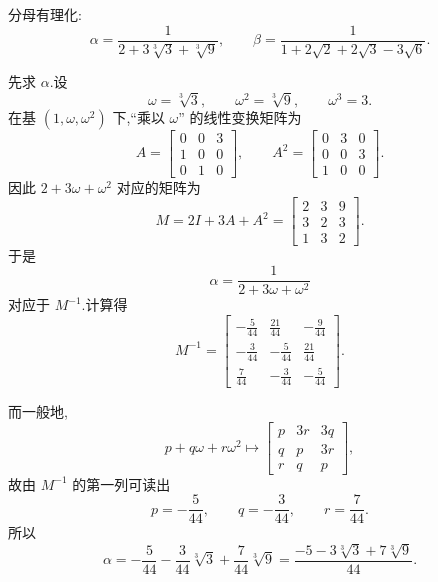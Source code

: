 \begin{problem}
    分母有理化:
    \[
        \alpha=\frac{1}{2+3\sqrt[3]{3}+\sqrt[3]{9}},
        \qquad
        \beta=\frac{1}{1+2\sqrt2+2\sqrt3-3\sqrt6}.
    \]

    \begin{solution}
        先求 $\alpha$.设
        \[
            \omega=\sqrt[3]{3},\qquad \omega^2=\sqrt[3]{9},\qquad \omega^3=3.
        \]
        在基 $\left(1,\omega,\omega^2\right)$ 下,“乘以 $\omega$” 的线性变换矩阵为
        \[
            A=
            \begin{bmatrix}
                0 & 0 & 3\\
                1 & 0 & 0\\
                0 & 1 & 0
            \end{bmatrix},
            \qquad
            A^2=
            \begin{bmatrix}
                0 & 3 & 0\\
                0 & 0 & 3\\
                1 & 0 & 0
            \end{bmatrix}.
        \]
        因此 $2+3\omega+\omega^2$ 对应的矩阵为
        \[
            M=2I+3A+A^2=
            \begin{bmatrix}
                2 & 3 & 9\\
                3 & 2 & 3\\
                1 & 3 & 2
            \end{bmatrix}.
        \]
        于是
        \[
            \alpha=\frac1{2+3\omega+\omega^2}
        \]
        对应于 $M^{-1}$.计算得
        \[
            M^{-1}=
            \begin{bmatrix}
                -\frac5{44} & \frac{21}{44} & -\frac9{44}\\[2mm]
                -\frac3{44} & -\frac5{44} & \frac{21}{44}\\[2mm]
                \frac7{44} & -\frac3{44} & -\frac5{44}
            \end{bmatrix}.
        \]

        而一般地,
        \[
            p+q\omega+r\omega^2
            \longmapsto
            \begin{bmatrix}
                p & 3r & 3q\\
                q & p & 3r\\
                r & q & p
            \end{bmatrix},
        \]
        故由 $M^{-1}$ 的第一列可读出
        \[
            p=-\frac5{44},\qquad q=-\frac3{44},\qquad r=\frac7{44}.
        \]
        所以
        \[
            \boxed{
                \alpha
                =-\frac5{44}-\frac3{44}\sqrt[3]{3}+\frac7{44}\sqrt[3]{9}
                =\frac{-5-3\sqrt[3]{3}+7\sqrt[3]{9}}{44}
            }.
        \]


\end{solution}
\end{problem}
